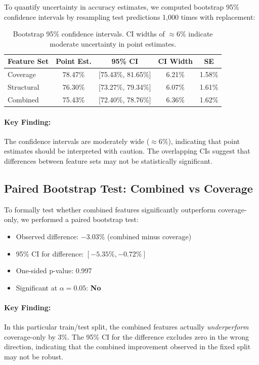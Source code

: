 \documentclass[12pt,a4paper]{article}
\begin{document}
To quantify uncertainty in accuracy estimates, we computed bootstrap 95\% confidence intervals
by resampling test predictions 1,000 times with replacement:

\begin{table}[h]
\centering
\begin{tabular}{lcccc}
\hline
\textbf{Feature Set} & \textbf{Point Est.} & \textbf{95\% CI} & \textbf{CI Width} & \textbf{SE} \\
\hline
Coverage & 78.47\% & [75.43\%, 81.65\%] & 6.21\% & 1.58\% \\
Structural & 76.30\% & [73.27\%, 79.34\%] & 6.07\% & 1.61\% \\
Combined & 75.43\% & [72.40\%, 78.76\%] & 6.36\% & 1.62\% \\
\hline
\end{tabular}
\caption{Bootstrap 95\% confidence intervals. CI widths of $\approx6\%$ indicate moderate
uncertainty in point estimates.}
\label{tab:bootstrap_ci}
\end{table}

\paragraph{Key Finding:} The confidence intervals are moderately wide ($\approx6\%$), indicating
that point estimates should be interpreted with caution. The overlapping CIs suggest that
differences between feature sets may not be statistically significant.

\subsection{Paired Bootstrap Test: Combined vs Coverage}

To formally test whether combined features significantly outperform coverage-only, we performed
a paired bootstrap test:

\begin{itemize}
\item Observed difference: $-3.03\%$ (combined minus coverage)
\item 95\% CI for difference: $[-5.35\%, -0.72\%]$
\item One-sided p-value: 0.997
\item Significant at $\alpha=0.05$: \textbf{No}
\end{itemize}

\paragraph{Key Finding:} In this particular train/test split, the combined features actually
\textit{underperform} coverage-only by 3\%. The 95\% CI for the difference excludes zero in
the wrong direction, indicating that the combined improvement observed in the fixed split
may not be robust.
\end{document}

